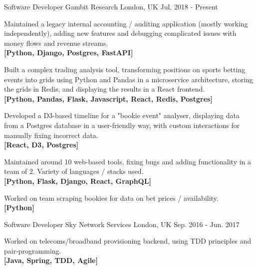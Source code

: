 

\begin{cventries}

  \cventry
    {Software Developer} %
    {Gambit Research} %
    {London, UK} %
    {Jul. 2018 - Present} %
    {
      \begin{cvitems} %
          \item {Maintained a legacy internal accounting / auditing application (mostly working independently), adding new features and debugging complicated issues with money flows and revenue streams. \\\textbf{[Python, Django, Postgres, FastAPI]}}
          \item {Built a complex trading analysis tool, transforming positions on sports betting events into grids using Python and Pandas in a microservice architecture, storing the grids in Redis, and displaying the results in a React frontend.\\\textbf{[Python, Pandas, Flask, Javascript, React, Redis, Postgres]}}
          \item{Developed a D3-based timeline for a "bookie event" analyser, displaying data from a Postgres database in a user-friendly way, with custom interactions for manually fixing incorrect data.\\\textbf{[React, D3, Postgres]}}
          \item {Maintained around 10 web-based tools, fixing bugs and adding functionality in a team of 2. Variety of languages / stacks used.\\\textbf{[Python, Flask, Django, React, GraphQL]}}
          \item {Worked on team scraping bookies for data on bet prices / availability.\\\textbf{[Python]}}
      \end{cvitems}
    }


  \cventry
  {Software Developer} %
    {Sky Network Services} %
    {London, UK} %
    {Sep. 2016 - Jun. 2017} %
    {
      \begin{cvitems} %
      \item {Worked on telecoms/broadband provisioning backend, using TDD principles and pair-programming.\\\textbf{[Java, Spring, TDD, Agile]}}
      \end{cvitems}
    }


\end{cventries}
